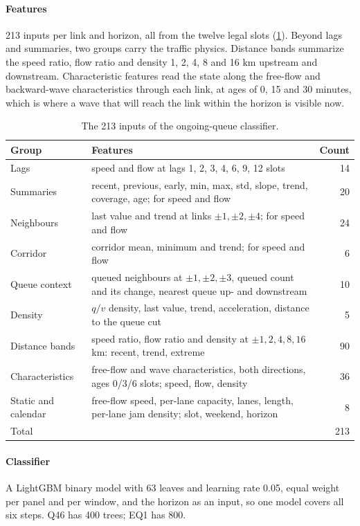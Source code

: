 \paragraph{Features} 213 inputs per link and horizon, all from the twelve legal slots (\cref{tab:queue-features}).
Beyond lags and summaries, two groups carry the traffic physics. Distance bands summarize the speed ratio, flow ratio
and density 1, 2, 4, 8 and 16 km upstream and downstream. Characteristic features read the state along the free-flow
and backward-wave characteristics through each link, at ages of 0, 15 and 30 minutes, which is where a wave that will
reach the link within the horizon is visible now.

\begin{table}[h]
\centering\small
\caption{The 213 inputs of the ongoing-queue classifier.}\label{tab:queue-features}
\begin{tabularx}{\linewidth}{@{}l X r@{}}
\toprule
Group & Features & Count \\
\midrule
Lags & speed and flow at lags 1, 2, 3, 4, 6, 9, 12 slots & 14 \\
Summaries & recent, previous, early, min, max, std, slope, trend, coverage, age; for speed and flow & 20 \\
Neighbours & last value and trend at links $\pm1,\pm2,\pm4$; for speed and flow & 24 \\
Corridor & corridor mean, minimum and trend; for speed and flow & 6 \\
Queue context & queued neighbours at $\pm1,\pm2,\pm3$, queued count and its change, nearest queue up- and downstream & 10 \\
Density & $q/v$ density, last value, trend, acceleration, distance to the queue cut & 5 \\
Distance bands & speed ratio, flow ratio and density at $\pm1,2,4,8,16$ km: recent, trend, extreme & 90 \\
Characteristics & free-flow and wave characteristics, both directions, ages 0/3/6 slots; speed, flow, density & 36 \\
Static and calendar & free-flow speed, per-lane capacity, lanes, length, per-lane jam density; slot, weekend, horizon & 8 \\
\midrule
Total & & 213 \\
\bottomrule
\end{tabularx}
\end{table}

\paragraph{Classifier} A LightGBM binary model with 63 leaves and learning rate 0.05, equal weight per panel and per
window, and the horizon as an input, so one model covers all six steps. Q46 has 400 trees; EQ1 has 800.

